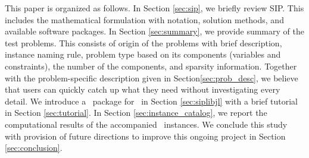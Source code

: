 
This paper is organized as follows. In Section \ref{sec:sip}, we briefly review SIP. This includes the mathematical formulation with notation, solution methods, and available software packages. In Section \ref{sec:summary}, we provide summary of the test problems. This consists of origin of the problems with brief description, instance naming rule, problem type based on its components (variables and constraints), the number of the components, and sparsity information. Together with the problem-specific description given in Section\ref{sec:prob_desc}, we believe that users can quickly catch up what they need without investigating every detail. We introduce a \julia\ package for \siplibtwo\ in Section \ref{sec:siplibjl} with a brief tutorial in Section \ref{sec:tutorial}. In Section \ref{sec:instance_catalog}, we report the computational results of the accompanied \smps\ instances. We conclude this study with provision of future directions to improve this ongoing project in Section \ref{sec:conclusion}. 







